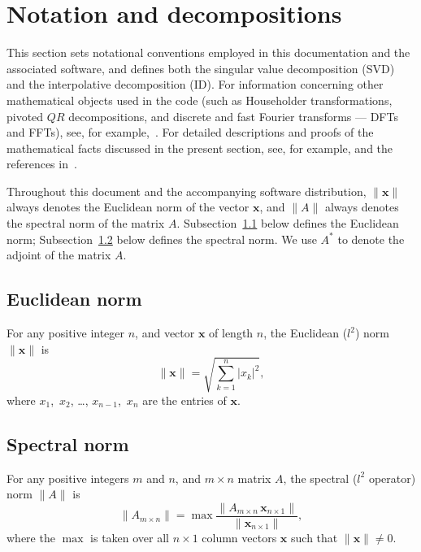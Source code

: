 \documentclass[letterpaper,12pt]{article}
\def\x{\mathbf{x}}
\begin{document}
\section{Notation and decompositions}
\label{defs}

This section sets notational conventions employed
in this documentation and the associated software,
and defines both the singular value decomposition (SVD)
and the interpolative decomposition (ID).
For information concerning other mathematical objects
used in the code (such as Householder transformations,
pivoted $QR$ decompositions, and discrete and fast Fourier transforms
--- DFTs and FFTs), see, for example,~\cite{golub-van_loan}.
For detailed descriptions and proofs of the mathematical facts
discussed in the present section, see, for example,
\cite{golub-van_loan} and the references
in~\cite{halko-martinsson-tropp}.

Throughout this document and the accompanying software distribution,
$\| \x \|$ always denotes the Euclidean norm of the vector $\x$,
and $\| A \|$ always denotes the spectral norm of the matrix $A$.
Subsection~\ref{Euclidean} below defines the Euclidean norm;
Subsection~\ref{spectral} below defines the spectral norm.
We use $A^*$ to denote the adjoint of the matrix $A$.


\subsection{Euclidean norm}
\label{Euclidean}

For any positive integer $n$, and vector $\x$ of length $n$,
the Euclidean ($l^2$) norm $\| \x \|$ is
%
\begin{equation}
\| \x \| = \sqrt{ \sum_{k=1}^n |x_k|^2 },
\end{equation}
%
where $x_1$,~$x_2$, \dots, $x_{n-1}$,~$x_n$ are the entries of $\x$.


\subsection{Spectral norm}
\label{spectral}

For any positive integers $m$ and $n$, and $m \times n$ matrix $A$,
the spectral ($l^2$ operator) norm $\| A \|$ is
%
\begin{equation}
\| A_{m \times n} \|
= \max \frac{\| A_{m \times n} \, \x_{n \times 1} \|}
            {\| \x_{n \times 1} \|},
\end{equation}
%
where the $\max$ is taken over all $n \times 1$ column vectors $\x$
such that $\| \x \| \ne 0$.
\end{document}

